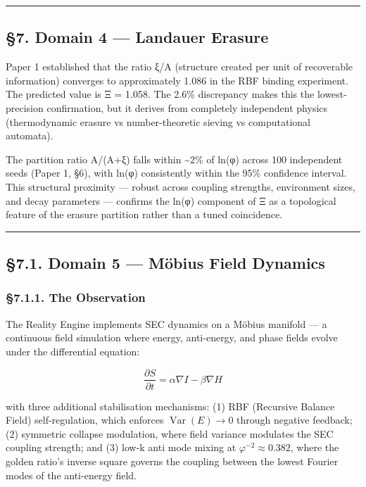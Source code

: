 \documentclass[
  11pt,
  a4paper]{article}
\begin{document}
\begin{center}\rule{0.5\linewidth}{0.5pt}\end{center}

\subsection{§7. Domain 4 --- Landauer
Erasure}\label{domain-4-landauer-erasure}

Paper 1 established that the ratio ξ/A (structure created per unit of
recoverable information) converges to approximately 1.086 in the RBF
binding experiment. The predicted value is Ξ = 1.058. The 2.6\%
discrepancy makes this the lowest-precision confirmation, but it derives
from completely independent physics (thermodynamic erasure vs
number-theoretic sieving vs computational automata).

The partition ratio A/(A+ξ) falls within \textasciitilde2\% of ln(φ)
across 100 independent seeds (Paper 1, §6), with ln(φ) consistently
within the 95\% confidence interval. This structural proximity ---
robust across coupling strengths, environment sizes, and decay
parameters --- confirms the ln(φ) component of Ξ as a topological
feature of the erasure partition rather than a tuned coincidence.

\begin{center}\rule{0.5\linewidth}{0.5pt}\end{center}

\subsection{§7.1. Domain 5 --- Möbius Field
Dynamics}\label{domain-5-muxf6bius-field-dynamics}

\subsubsection{§7.1.1. The Observation}\label{the-observation-1}

The Reality Engine implements SEC dynamics on a Möbius manifold --- a
continuous field simulation where energy, anti-energy, and phase fields
evolve under the differential equation:

\[\frac{\partial S}{\partial t} = \alpha \nabla I - \beta \nabla H\]

with three additional stabilisation mechanisms: (1) RBF (Recursive
Balance Field) self-regulation, which enforces
\(\operatorname{Var}(E) \to 0\) through negative feedback; (2) symmetric
collapse modulation, where field variance modulates the SEC coupling
strength; and (3) low-k anti mode mixing at
\(\varphi^{-2} \approx 0.382\), where the golden ratio's inverse square
governs the coupling between the lowest Fourier modes of the anti-energy
field.
\end{document}
